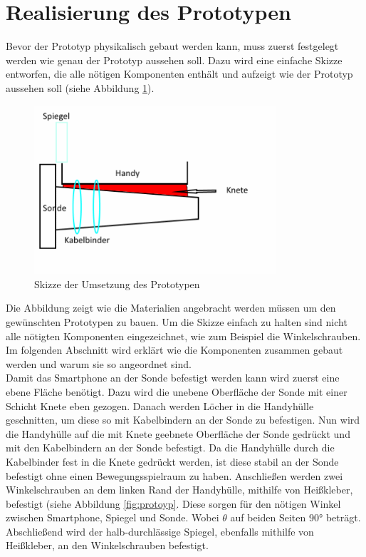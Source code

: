 \section{Realisierung des Prototypen}

Bevor der Prototyp physikalisch gebaut werden kann, muss zuerst festgelegt werden wie genau der Prototyp aussehen soll. Dazu wird eine einfache Skizze entworfen, die alle nötigen Komponenten enthält und aufzeigt wie der Prototyp aussehen soll (siehe Abbildung \ref{fig:protoyp_skizze_umsetzung}).
\begin{figure}[h]
	\centering
	\includegraphics[width=0.80\textwidth]{Prototypen_Bau/Prototyp_skizze}
	\caption{Skizze der Umsetzung des Prototypen}
	\label{fig:protoyp_skizze_umsetzung}
\end{figure}
Die Abbildung zeigt wie die Materialien angebracht werden müssen um den gewünschten Prototypen zu bauen. Um die Skizze einfach zu halten sind nicht alle nötigten Komponenten eingezeichnet, wie zum Beispiel die Winkelschrauben. Im folgenden Abschnitt wird erklärt wie die Komponenten zusammen gebaut werden und warum sie so angeordnet sind.\\
Damit das Smartphone an der Sonde befestigt werden kann wird zuerst eine ebene Fläche benötigt. Dazu wird die unebene Oberfläche der Sonde mit einer Schicht Knete eben gezogen. Danach werden Löcher in die Handyhülle geschnitten, um diese so mit Kabelbindern an der Sonde zu befestigen. Nun wird die Handyhülle auf die mit Knete geebnete Oberfläche der Sonde gedrückt und mit den Kabelbindern an der Sonde befestigt. Da die Handyhülle durch die Kabelbinder fest in die Knete gedrückt werden, ist diese stabil an der Sonde befestigt ohne einen Bewegungsspielraum zu haben. Anschließen werden zwei Winkelschrauben an dem linken Rand der Handyhülle, mithilfe von Heißkleber, befestigt (siehe Abbildung \ref{fig:protoyp}. Diese sorgen für den nötigen Winkel zwischen Smartphone, Spiegel und Sonde. Wobei $\theta$ auf beiden Seiten 90° beträgt. Abschließend wird der halb-durchlässige Spiegel, ebenfalls mithilfe von Heißkleber, an den Winkelschrauben befestigt.\\
